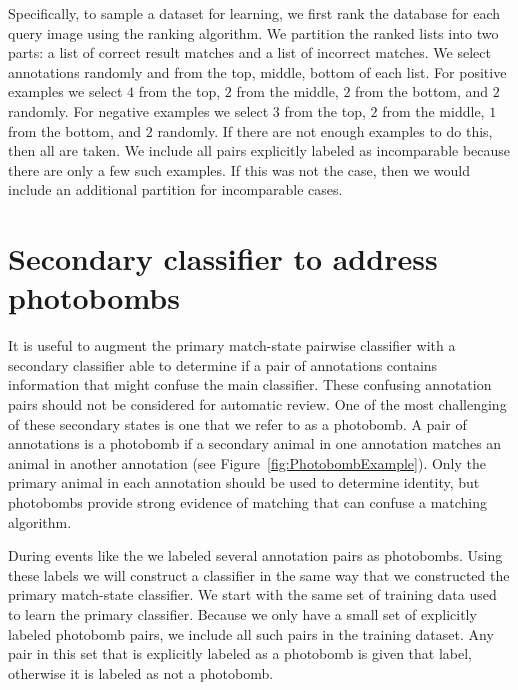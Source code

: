     Specifically, to sample a dataset for learning, we first rank the database for each query image using the
      ranking algorithm.
    We partition the ranked lists into two parts:
    a list of correct result matches and a list of incorrect matches.
    We select annotations randomly and from the top, middle, bottom of each list.
    For positive examples we select $4$ from the top, $2$ from the middle, $2$ from the bottom, and $2$ randomly.
    For negative examples we select $3$ from the top, $2$ from the middle, $1$ from the bottom, and $2$ randomly.
    If there are not enough examples to do this, then all are taken.
    We include all pairs explicitly labeled as incomparable because there are only a few such examples.
    If this was not the case, then we would include an additional partition for incomparable cases.


\section{Secondary classifier to address photobombs}\label{sec:learnpb}
    It is useful to augment the primary match-state pairwise classifier with a secondary classifier able to
      determine if a pair of annotations contains information that might confuse the main classifier.
    These confusing annotation pairs should not be considered for automatic review.
    One of the most challenging of these secondary states is one that we refer to as a {photobomb}.
    A pair of annotations is a photobomb if a secondary animal in one annotation matches an animal in another
      annotation (\eg see Figure~\ref{fig:PhotobombExample}).
    Only the primary animal in each annotation should be used to determine identity, but photobombs provide
      strong evidence of matching that can confuse a matching algorithm.

    \PhotobombExample{}

    During events like the \GZC{} we labeled several annotation pairs as photobombs.
    Using these labels we will construct a classifier in the same way that we constructed the primary match-state
      classifier.
    We start with the same set of training data used to learn the primary classifier.
    Because we only have a small set of explicitly labeled photobomb pairs, we include all such pairs in the
      training dataset.
    Any pair in this set that is explicitly labeled as a photobomb is given that label, otherwise it is labeled
      as not a photobomb.


